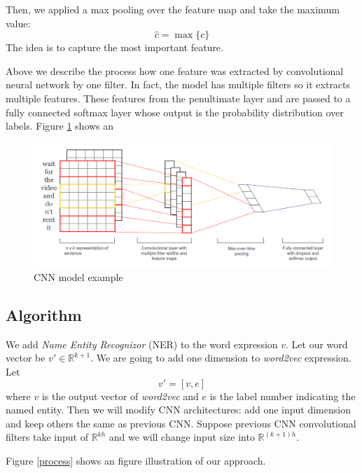 \documentclass[10pt,twocolumn,letterpaper]{article}
\begin{document}
Then, we applied a max pooling over the feature map and take the maximum value:
$$\hat{c} = \max \{c\}$$
The idea is to capture the most important feature.

Above we describe the process how one feature was extracted by convolutional neural network by one filter. In fact, the model has multiple filters so it extracts multiple features. These features from the penultimate layer and are passed to a fully connected softmax layer whose output is the probability distribution over labels. Figure \ref{cnn} shows an

\begin{figure}
  \includegraphics[width=\linewidth]{cnn.png}
  \caption{CNN model example}
  \label{cnn}
\end{figure}


\subsection{Algorithm}
We add \textit{Name Entity Recognizor} (NER) to the word expression $v$. Let our word vector be $v' \in \mathbb{R}^{k+1}$. We are going to add one dimension to \textit{word2vec} expression. Let
$$v' = [v, e]$$
where $v$ is the output vector of \textit{word2vec} and $e$ is the label number indicating the named entity. Then we will modify CNN architectures: add one input dimension and keep others the same as previous CNN. Suppose previous CNN convolutional filters take input of $\mathbb{R}^{kh}$ and we will change input size into $\mathbb{R}^{(k+1)h}$. 

Figure \ref{process} shows an figure illustration of our approach.
 
\end{document}
